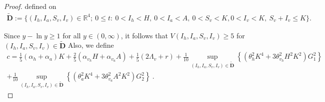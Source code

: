 \begin{proof}
defined on
\begin{align*}
	\widetilde{\mathbf{D}} 
		:=\{ 
			\left( 
				I_{h}, I_{a}, S_{v},I_{v} 
			\right) \in \mathbb{R}^{4};  
			\ 0\leq t: \ 
			0<I_{h}< H,
			\ 
			0<I_{a}< A,
			\ 
			0< S_{v}< K,
			0< I_{v}< K,
			\ 
			S_{v}+I_{v}\leq K
		\}.
\end{align*}

Since $y-\ln y \geq 1$ for all $y\in \left(0,\infty \right)$, it follows that 
$
	V \left( 
		I_{h},I_{a},S_{v},I_{v} 
	\right) \geq 5
$
for
$
	\left(
		I_{h},I_{a},S_{v},I_{v} 
	\right)\in \widetilde{\mathbf{D}}
$
Also, we define
\begin{multline*}
	c = \frac{1}{5}
		\left( 
			\alpha_{h}
			+\alpha_{a}
		\right) K 
		+ 
		\frac{2}{5}
		\left(
			\alpha_{v_{h}}H
			+\alpha_{v_{a}}A
		\right)
		+\frac{1}{5}
		\left( 
			2\Lambda_{v}+r
		\right) 
		+
		\frac{1}{10}
		\sup
		\limits_{(I_{h},I_{a},S_{v},I_{v})
		\in 
		\widetilde{\mathbf{D}}}  
		\left\{
			\left(
				\theta_{h}^{2}K^{4}
				+3 \theta_{v_{h}}^{2}H^{2}K^{2} 
			\right)G_{1}^{2}
		\right\}\\
		+
		\frac{1}{10}
		\sup
		\limits_{(I_{h},I_{a},S_{v},I_{v})
		\in 
		\widetilde{\mathbf{D}}} 
		\left\{
			\left(
				\theta_{a}^{2}K^{4}
				+3\theta_{v_{a}}^{2}A^{2} K^{2} 
			\right)G_{2}^{2}
		\right\} ~.
\end{multline*}


\end{proof}
